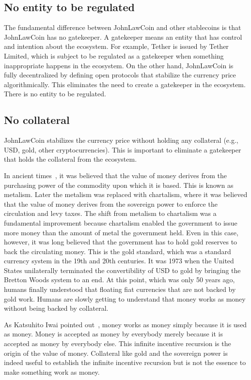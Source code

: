 \documentclass[dvipdfmx,a4paper]{article}
\begin{document}
\subsection{No entity to be regulated}

The fundamental difference between JohnLawCoin and other stablecoins is that JohnLawCoin has no gatekeeper. A gatekeeper means an entity that has control and intention about the ecosystem. For example, Tether is issued by Tether Limited, which is subject to be regulated as a gatekeeper when something inappropriate happens in the ecosystem. On the other hand, JohnLawCoin is fully decentralized by defining open protocols that stabilize the currency price algorithmically. This eliminates the need to create a gatekeeper in the ecosystem. There is no entity to be regulated.

\subsection{No collateral}

JohnLawCoin stabilizes the currency price without holding any collateral (e.g., USD, gold, other cryptocurrencies). This is important to eliminate a gatekeeper that holds the collateral from the ecosystem.

In ancient times~\cite{davies2010history,ferguson2008ascent}, it was believed that the value of money derives from the purchasing power of the commodity upon which it is based. This is known as metalism. Later the metalism was replaced with chartalism, where it was believed that the value of money derives from the sovereign power to enforce the circulation and levy taxes. The shift from metalism to chartalism was a fundamental improvement because chartalism enabled the government to issue more money than the amount of metal the government held. Even in this case, however, it was long believed that the government has to hold gold reserves to back the circulating money. This is the gold standard, which was a standard currency system in the 19th and 20th centuries. It was 1973 when the United States unilaterally terminated the convertibility of USD to gold by bringing the Bretton Woods system to an end. At this point, which was only 50 years ago, humans finally understood that floating fiat currencies that are not backed by gold work. Humans are slowly getting to understand that money works as money without being backed by collateral.

As Katsuhito Iwai pointed out~\cite{iwai1996boostrap,iwai1997evolution}, money works as money simply because it is used as money. Money is accepted as money by everybody merely because it is accepted as money by everybody else. This infinite incentive recursion is the origin of the value of money. Collateral like gold and the sovereign power is indeed useful to establish the infinite incentive recursion but is not the essence to make something work as money.
\end{document}
